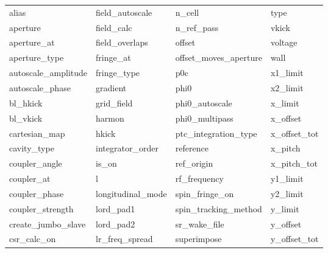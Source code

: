  \begin{tabular}{llll} \toprule
alias                       & field_autoscale             & n_cell                      & type                        \\
aperture                    & field_calc                  & n_ref_pass                  & vkick                       \\
aperture_at                 & field_overlaps              & offset                      & voltage                     \\
aperture_type               & fringe_at                   & offset_moves_aperture       & wall                        \\
autoscale_amplitude         & fringe_type                 & p0c                         & x1_limit                    \\
autoscale_phase             & gradient                    & phi0                        & x2_limit                    \\
bl_hkick                    & grid_field                  & phi0_autoscale              & x_limit                     \\
bl_vkick                    & harmon                      & phi0_multipass              & x_offset                    \\
cartesian_map               & hkick                       & ptc_integration_type        & x_offset_tot                \\
cavity_type                 & integrator_order            & reference                   & x_pitch                     \\
coupler_angle               & is_on                       & ref_origin                  & x_pitch_tot                 \\
coupler_at                  & l                           & rf_frequency                & y1_limit                    \\
coupler_phase               & longitudinal_mode           & spin_fringe_on              & y2_limit                    \\
coupler_strength            & lord_pad1                   & spin_tracking_method        & y_limit                     \\
create_jumbo_slave          & lord_pad2                   & sr_wake_file                & y_offset                    \\
csr_calc_on                 & lr_freq_spread              & superimpose                 & y_offset_tot                \\

\end{tabular}
